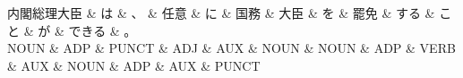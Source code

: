 \documentclass[tikz,border=5pt]{standalone}
\begin{document}
\normalsize
\begin{dependency}[edge unit distance=12.0pt]
    \begin{deptext}[column sep=1em]
        内閣総理大臣 \& は \& 、 \& 任意 \& に \& 国務 \& 大臣 \& を \& 罷免 \& する \& こと \& が \& できる \& 。\\
        NOUN \& ADP \& PUNCT \& ADJ \& AUX \& NOUN \& NOUN \& ADP \& VERB \& AUX \& NOUN \& ADP \& AUX \& PUNCT\\
    \end{deptext}
\end{dependency}
\end{document}
